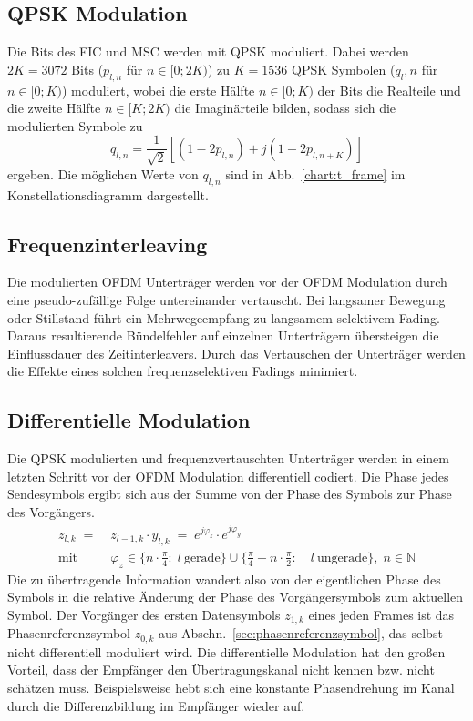 \subsection{QPSK Modulation}
\label{sec:qpsk}
Die Bits des FIC und MSC werden mit QPSK moduliert. Dabei werden $2K=3072$ Bits ($p_{l,n}$ für $n\in[0;2K)$) zu $K=1536$ QPSK Symbolen ($q_l,n$ für $n\in[0;K)$) moduliert, wobei die erste Hälfte $n\in [0;K)$ der Bits die Realteile und die zweite Hälfte $n\in [K;2K)$ die Imaginärteile bilden, sodass sich die modulierten Symbole zu
\begin{equation}
q_{l,n} = \frac{1}{\sqrt{2}}\left[\left(1-2p_{l,n}\right)+j\left(1-2p_{l,n+K}\right)\right]
\end{equation}
ergeben. Die möglichen Werte von $q_{l,n}$ sind in Abb.~\ref{chart:t_frame} im Konstellationsdiagramm dargestellt.

\subsection{Frequenzinterleaving}
Die modulierten OFDM Unterträger werden vor der OFDM Modulation durch eine pseudo-zufällige Folge untereinander vertauscht. Bei langsamer Bewegung oder Stillstand führt ein Mehrwegeempfang zu langsamem selektivem Fading. Daraus resultierende Bündelfehler auf einzelnen Unterträgern übersteigen die Einflussdauer des Zeitinterleavers. Durch das Vertauschen der Unterträger werden die Effekte eines solchen frequenzselektiven Fadings minimiert. 


\subsection{Differentielle Modulation}
\label{sec:diff_mod}
Die QPSK modulierten und frequenzvertauschten Unterträger werden in einem letzten Schritt vor der OFDM Modulation differentiell codiert. Die Phase jedes Sendesymbols ergibt sich aus der Summe von der Phase des Symbols zur Phase des Vorgängers.
\begin{equation}
\begin{aligned}
z_{l,k}\; =\; &z_{l-1,k}\cdot y_{l,k}\; =\; e^{j\varphi_z} \cdot e^{j\varphi_y} \\
\text{mit} \; \; &\varphi_z \in \{n \cdot \frac{\pi}{4}: \; l \: \text{gerade}\} \cup \{\frac{\pi}{4} + n \cdot \frac{\pi}{2}: \quad l \: \text{ungerade}\}, \; n\in \mathbb{N} 
\end{aligned}
\end{equation}
Die zu übertragende Information wandert also von der eigentlichen Phase des Symbols in die relative Änderung der Phase des Vorgängersymbols zum aktuellen Symbol. Der Vorgänger des ersten Datensymbols $z_{1,k}$ eines jeden Frames ist das Phasenreferenzsymbol $z_{0,k}$ aus Abschn.~\ref{sec:phasenreferenzsymbol}, das selbst nicht differentiell moduliert wird. Die differentielle Modulation hat den großen Vorteil, dass der Empfänger den Übertragungskanal nicht kennen bzw. nicht schätzen muss. Beispielsweise hebt sich eine konstante Phasendrehung im Kanal durch die Differenzbildung im Empfänger wieder auf.

